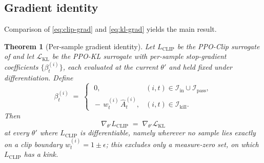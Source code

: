 \documentclass{article}
\newtheorem{theorem}{Theorem}
\begin{document}
\subsection{Gradient identity}

Comparison of \eqref{eq:clip-grad} and \eqref{eq:kl-grad} yields the
main result.

\begin{theorem}[Per-sample gradient identity]
\label{thm:identity}
Let $L_{\mathrm{CLIP}}$ be the PPO-Clip surrogate of
\citet{schulman2017ppo} and let $\mathcal{L}_{\mathrm{KL}}$ be the
PPO-KL surrogate with per-sample stop-gradient coefficients
$\{\beta_t^{(i)}\}$, each evaluated at the current $\theta'$ and held
fixed under differentiation. Define
\begin{equation}
\beta_t^{(i)}
\;=\;
\begin{cases}
\;0,
  & (i,t) \in \mathcal{I}_{\mathrm{in}} \cup \mathcal{I}_{\mathrm{pass}}, \\[2pt]
\,-\,w_t^{(i)}\,\hat{A}_t^{(i)},
  & (i,t) \in \mathcal{I}_{\mathrm{kill}}.
\end{cases}
\label{eq:beta-def}
\end{equation}
Then
\[
\nabla_{\theta'} L_{\mathrm{CLIP}} \;=\; \nabla_{\theta'}\mathcal{L}_{\mathrm{KL}}
\]
at every $\theta'$ where $L_{\mathrm{CLIP}}$ is differentiable, namely
wherever no sample lies exactly on a clip boundary
$w_t^{(i)} = 1\pm\epsilon$; this excludes only a measure-zero set, on
which $L_{\mathrm{CLIP}}$ has a kink.
\end{theorem}
\end{document}
